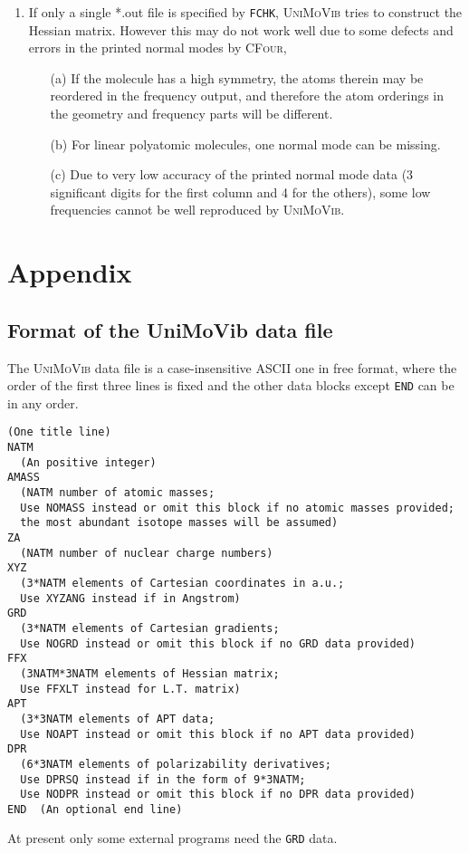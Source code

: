 \documentclass[12pt,english]{extarticle}
\begin{document}
\begin{itemize}
\begin{enumerate}
  \item If only a single *.out file is specified by \verb|FCHK|, \textsc{UniMoVib} tries to construct the Hessian matrix. However this may do not work well due to some defects and errors in the printed normal modes by \textsc{CFour},
  \begin{itemize}
    \item[(a)] If the molecule has a high symmetry, the atoms therein may be reordered in the frequency output, and therefore the atom orderings in the geometry and frequency parts will be different.
    \item[(b)] For linear polyatomic molecules, one normal mode can be missing.
    \item[(c)] Due to very low accuracy of the printed normal mode data (3 significant digits for the first column and 4 for the others), some low frequencies cannot be well reproduced by \textsc{UniMoVib}.
  \end{itemize}
\end{enumerate}


\end{itemize}


\pagebreak{}

\appendix
\section{Appendix} \label{part:appdx}

\subsection{Format of the UniMoVib data file} \label{sec:almfmt}

The \textsc{UniMoVib} data file is a case-insensitive ASCII one in free format, where the order of the first three lines is fixed and the other data blocks except \verb|END| can be in any order.
\begin{Verbatim}[frame=single,label=Format(Ver.1.1.0 2020.10.24),labelposition=topline,rulecolor=\color{blue},fontsize=\small,baselinestretch=1.0]
(One title line)
NATM
  (An positive integer)
AMASS
  (NATM number of atomic masses;
  Use NOMASS instead or omit this block if no atomic masses provided;
  the most abundant isotope masses will be assumed)
ZA
  (NATM number of nuclear charge numbers)
XYZ
  (3*NATM elements of Cartesian coordinates in a.u.;
  Use XYZANG instead if in Angstrom)
GRD
  (3*NATM elements of Cartesian gradients;
  Use NOGRD instead or omit this block if no GRD data provided)
FFX
  (3NATM*3NATM elements of Hessian matrix;
  Use FFXLT instead for L.T. matrix)
APT
  (3*3NATM elements of APT data;
  Use NOAPT instead or omit this block if no APT data provided)
DPR
  (6*3NATM elements of polarizability derivatives;
  Use DPRSQ instead if in the form of 9*3NATM;
  Use NODPR instead or omit this block if no DPR data provided)
END  (An optional end line)
\end{Verbatim}
At present only some external programs need the \verb|GRD| data.
\end{document}
